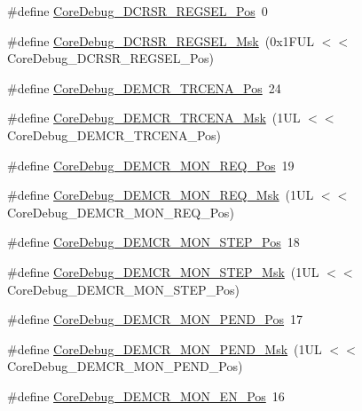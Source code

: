 \begin{DoxyCompactItemize}
\#define \hyperlink{group___c_m_s_i_s___core_debug_ga52182c8a9f63a52470244c0bc2064f7b}{Core\+Debug\+\_\+\+D\+C\+R\+S\+R\+\_\+\+R\+E\+G\+S\+E\+L\+\_\+\+Pos}~0
\item 
\#define \hyperlink{group___c_m_s_i_s___core_debug_ga17cafbd72b55030219ce5609baa7c01d}{Core\+Debug\+\_\+\+D\+C\+R\+S\+R\+\_\+\+R\+E\+G\+S\+E\+L\+\_\+\+Msk}~(0x1\+F\+U\+L $<$$<$ Core\+Debug\+\_\+\+D\+C\+R\+S\+R\+\_\+\+R\+E\+G\+S\+E\+L\+\_\+\+Pos)
\item 
\#define \hyperlink{group___c_m_s_i_s___core_debug_ga6ff2102b98f86540224819a1b767ba39}{Core\+Debug\+\_\+\+D\+E\+M\+C\+R\+\_\+\+T\+R\+C\+E\+N\+A\+\_\+\+Pos}~24
\item 
\#define \hyperlink{group___c_m_s_i_s___core_debug_ga5e99652c1df93b441257389f49407834}{Core\+Debug\+\_\+\+D\+E\+M\+C\+R\+\_\+\+T\+R\+C\+E\+N\+A\+\_\+\+Msk}~(1\+U\+L $<$$<$ Core\+Debug\+\_\+\+D\+E\+M\+C\+R\+\_\+\+T\+R\+C\+E\+N\+A\+\_\+\+Pos)
\item 
\#define \hyperlink{group___c_m_s_i_s___core_debug_ga341020a3b7450416d72544eaf8e57a64}{Core\+Debug\+\_\+\+D\+E\+M\+C\+R\+\_\+\+M\+O\+N\+\_\+\+R\+E\+Q\+\_\+\+Pos}~19
\item 
\#define \hyperlink{group___c_m_s_i_s___core_debug_gae6384cbe8045051186d13ef9cdeace95}{Core\+Debug\+\_\+\+D\+E\+M\+C\+R\+\_\+\+M\+O\+N\+\_\+\+R\+E\+Q\+\_\+\+Msk}~(1\+U\+L $<$$<$ Core\+Debug\+\_\+\+D\+E\+M\+C\+R\+\_\+\+M\+O\+N\+\_\+\+R\+E\+Q\+\_\+\+Pos)
\item 
\#define \hyperlink{group___c_m_s_i_s___core_debug_ga9ae10710684e14a1a534e785ef390e1b}{Core\+Debug\+\_\+\+D\+E\+M\+C\+R\+\_\+\+M\+O\+N\+\_\+\+S\+T\+E\+P\+\_\+\+Pos}~18
\item 
\#define \hyperlink{group___c_m_s_i_s___core_debug_ga2ded814556de96fc369de7ae9a7ceb98}{Core\+Debug\+\_\+\+D\+E\+M\+C\+R\+\_\+\+M\+O\+N\+\_\+\+S\+T\+E\+P\+\_\+\+Msk}~(1\+U\+L $<$$<$ Core\+Debug\+\_\+\+D\+E\+M\+C\+R\+\_\+\+M\+O\+N\+\_\+\+S\+T\+E\+P\+\_\+\+Pos)
\item 
\#define \hyperlink{group___c_m_s_i_s___core_debug_ga1e2f706a59e0d8131279af1c7e152f8d}{Core\+Debug\+\_\+\+D\+E\+M\+C\+R\+\_\+\+M\+O\+N\+\_\+\+P\+E\+N\+D\+\_\+\+Pos}~17
\item 
\#define \hyperlink{group___c_m_s_i_s___core_debug_ga68ec55930269fab78e733dcfa32392f8}{Core\+Debug\+\_\+\+D\+E\+M\+C\+R\+\_\+\+M\+O\+N\+\_\+\+P\+E\+N\+D\+\_\+\+Msk}~(1\+U\+L $<$$<$ Core\+Debug\+\_\+\+D\+E\+M\+C\+R\+\_\+\+M\+O\+N\+\_\+\+P\+E\+N\+D\+\_\+\+Pos)
\item 
\#define \hyperlink{group___c_m_s_i_s___core_debug_ga802829678f6871863ae9ecf60a10425c}{Core\+Debug\+\_\+\+D\+E\+M\+C\+R\+\_\+\+M\+O\+N\+\_\+\+E\+N\+\_\+\+Pos}~16
$$
\end{DoxyCompactItemize}
